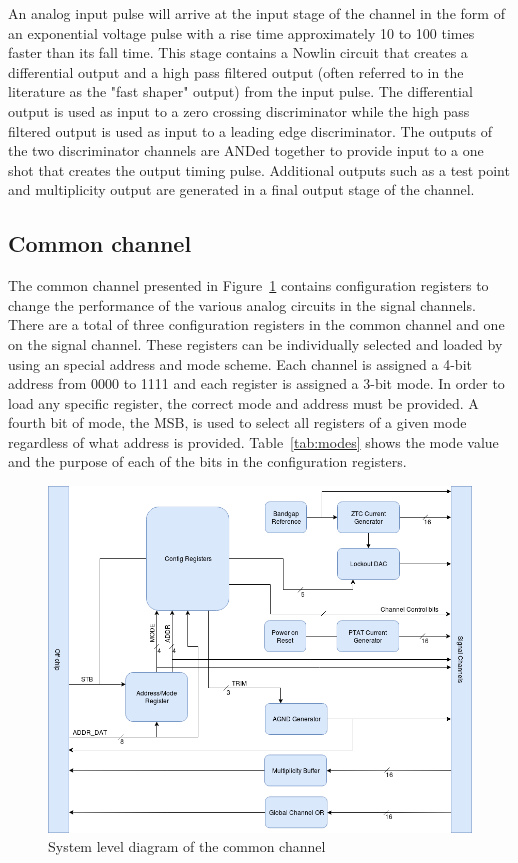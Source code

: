 \documentclass[12pt,oneside,final]{siuethesis}
\theoremstyle{definition}
\begin{document}
\par An analog input pulse will arrive at the input stage of the channel in the form of an exponential voltage pulse with a rise time approximately 10 to 100 times faster than its fall time. This stage contains a Nowlin circuit that creates a differential output and a high pass filtered output (often referred to in the literature as the "fast shaper" output) from the input pulse. The differential output is used as input to a zero crossing discriminator while the high pass filtered output is used as input to a leading edge discriminator. The outputs of the two discriminator channels are ANDed together to provide input to a one shot that creates the output timing pulse. Additional outputs such as a test point and multiplicity output are generated in a final output stage of the channel. 

\subsection{Common channel}
\par The common channel presented in Figure~\ref{fig:common-block} contains configuration registers to change the performance of the various analog circuits in the signal channels. There are a total of three configuration registers in the common channel and one on the signal channel. These registers can be individually selected and loaded by using an special address and mode scheme. Each channel is assigned a 4-bit address from 0000 to 1111 and each register is assigned a 3-bit mode. In order to load any specific register, the correct mode and address must be provided. A fourth bit of mode, the MSB, is used to select all registers of a given mode regardless of what address is provided. Table~\ref{tab:modes} shows the mode value and the purpose of each of the bits in the configuration registers.

\begin{figure}[htbp!]
\centering
\includegraphics[scale=.6,keepaspectratio=true, angle = 90]{./ch2_figures/common_block.png} 
\caption{System level diagram of the common channel}
\label{fig:common-block}
\end{figure}
\end{document}

